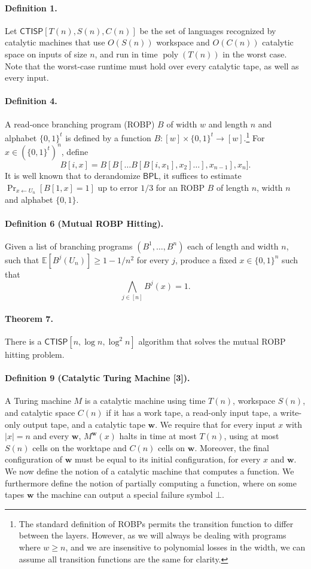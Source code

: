 \paragraph{Definition 1.} Let $\mathsf{CTISP}[T(n),S(n),C(n)]$ be the set of languages recognized by catalytic machines that use $O(S(n))$ workspace and $O(C(n))$ catalytic space on inputs of size $n$, and run in time $\operatorname{poly}(T(n))$ in the worst case.
Note that the worst-case runtime must hold over every catalytic tape, as well as every input.
\paragraph{Definition 4.} A read-once branching program (ROBP) $B$ of width $w$ and length $n$ and alphabet $\{0,1\}^t$ is defined by a function $B:[w]\times\{0,1\}^t\to[w]$.\footnote{The standard definition of ROBPs permits the transition function to differ between the layers. However, as we will always be dealing with programs where $w\geq n$, and we are insensitive to polynomial losses in the width, we can assume all transition functions are the same for clarity.} For $x\in(\{0,1\}^t)^n$, define
\[B[i,x]=B[B[\ldots B[B[i,x_1],x_2]\ldots],x_{n-1}],x_n].\]
It is well known that to derandomize $\mathsf{BPL}$, it suffices to estimate $\Pr_{x\leftarrow U_n}[B[1,x]=1]$ up to error $1/3$ for an ROBP $B$ of length $n$, width $n$ and alphabet $\{0,1\}$.
\paragraph{Definition 6 (Mutual ROBP Hitting).} Given a list of branching programs $(B^1,\ldots,B^n)$ each of length and width $n$, such that $\mathbb{E}[B^j(U_n)]\geq1-1/n^2$ for every $j$, produce a fixed $x\in\{0,1\}^n$ such that
\[\bigwedge_{j\in[n]}B^j(x)=1.\]
\paragraph{Theorem 7.} There is a $\mathsf{CTISP}[n,\log n,\log^2 n]$ algorithm that solves the mutual ROBP hitting problem.
\paragraph{Definition 9 (Catalytic Turing Machine [3]).} A Turing machine $M$ is a catalytic machine using time $T(n)$, workspace $S(n)$, and catalytic space $C(n)$ if it has a work tape, a read-only input tape, a write-only output tape, and a catalytic tape $\mathbf{w}$. We require that for every input $x$ with $|x|=n$ and every $\mathbf{w}$, $M^{\mathbf{w}}(x)$ halts in time at most $T(n)$, using at most $S(n)$ cells on the worktape and $C(n)$ cells on $\mathbf{w}$. Moreover, the final configuration of $\mathbf{w}$ must be equal to its initial configuration, for every $x$ and $\mathbf{w}$.
We now define the notion of a catalytic machine that computes a function. We furthermore define the notion of partially computing a function, where on some tapes $\mathbf{w}$ the machine can output a special failure symbol $\bot$.
